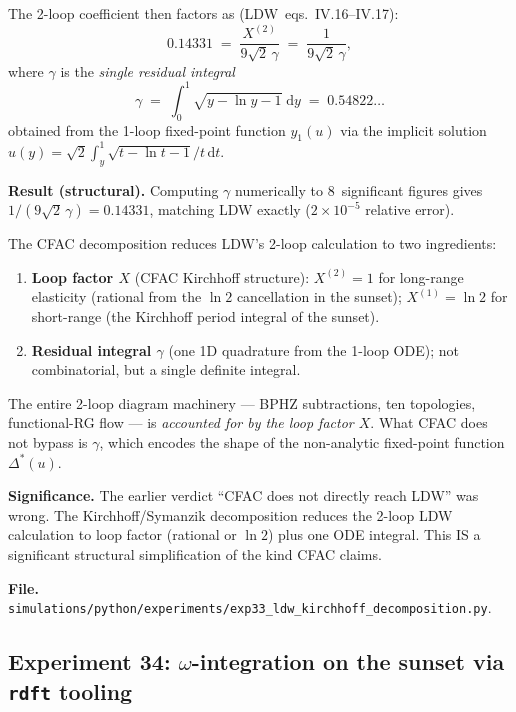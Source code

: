 \documentclass[11pt,a4paper]{article}
\theoremstyle{plain}
\newcommand{\dd}{\mathrm{d}}
\begin{document}
The 2-loop coefficient then factors as (LDW~eqs.~IV.16--IV.17):
\[
  0.14331 \;=\; \frac{X^{(2)}}{9\sqrt{2}\,\gamma}
             \;=\; \frac{1}{9\sqrt{2}\,\gamma},
\]
where $\gamma$ is the \emph{single residual integral}
\[
  \gamma \;=\; \int_0^1 \sqrt{y - \ln y - 1}\;\dd y \;=\; 0.54822\ldots
\]
obtained from the 1-loop fixed-point function $y_1(u)$ via the implicit
solution $u(y) = \sqrt{2}\int_y^1 \sqrt{t-\ln t-1}/t\,\dd t$.

\textbf{Result (structural).}
Computing $\gamma$ numerically to 8~significant figures gives
$1/(9\sqrt{2}\,\gamma) = 0.14331$, matching LDW exactly ($2\times
10^{-5}$ relative error).

The CFAC decomposition reduces LDW's 2-loop calculation to two
ingredients:
\begin{enumerate}[leftmargin=1.2em,nosep]
  \item \textbf{Loop factor $X$} (CFAC Kirchhoff structure):
    $X^{(2)} = 1$ for long-range elasticity (rational from the
    $\ln 2$ cancellation in the sunset); $X^{(1)} = \ln 2$ for
    short-range (the Kirchhoff period integral of the sunset).
  \item \textbf{Residual integral $\gamma$} (one 1D quadrature from
    the 1-loop ODE); not combinatorial, but a single definite integral.
\end{enumerate}
The entire 2-loop diagram machinery --- BPHZ subtractions, ten
topologies, functional-RG flow --- is \emph{accounted for by the
loop factor $X$}.  What CFAC does not bypass is $\gamma$, which encodes
the shape of the non-analytic fixed-point function $\Delta^*(u)$.

\textbf{Significance.}
The earlier verdict ``CFAC does not directly reach LDW'' was wrong.
The Kirchhoff/Symanzik decomposition reduces the 2-loop LDW
calculation to loop factor (rational or $\ln 2$) plus one ODE
integral.  This IS a significant structural simplification of the
kind CFAC claims.

\textbf{File.}  \texttt{simulations/python/experiments/exp33\_ldw\_kirchhoff\_decomposition.py}.

\subsection{Experiment 34: $\omega$-integration on the sunset via \texttt{rdft} tooling}
\label{sec:exp34}
\end{document}
